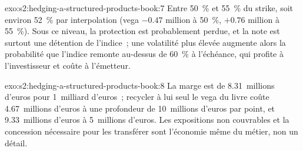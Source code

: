 \begin{solution}{exo:s2:hedging-a-structured-products-book:7}
Entre 50~\% et 55~\% du strike, soit environ 52~\% par interpolation (vega $-0.47$ million à 50~\%, $+0.76$ million à 55~\%). Sous ce niveau, la protection est
probablement perdue, et la note est surtout une détention de l'indice~; une volatilité plus élevée augmente alors la probabilité que l'indice remonte au-dessus de 60~\% à l'échéance,
qui profite à l'investisseur et coûte à l'émetteur.
\end{solution}

\begin{solution}{exo:s2:hedging-a-structured-products-book:8}
La marge est de 8.31~millions d'euros pour 1~milliard d'euros~; recycler à lui seul le vega du livre coûte 4.67~millions d'euros à une profondeur de 10~millions d'euros par point, et
9.33~millions d'euros à 5~millions d'euros. Les expositions non couvrables et la concession nécessaire pour les transférer sont l'économie même du métier, non un
détail.
\end{solution}

